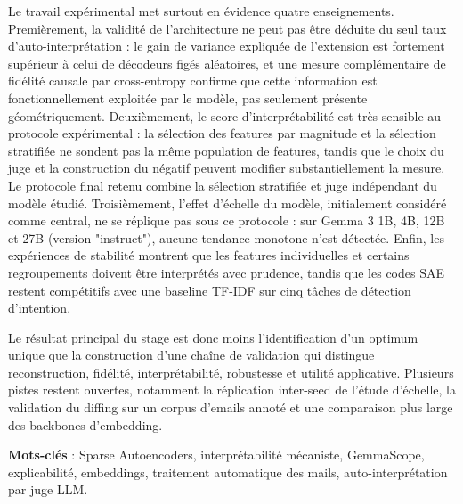 \documentclass[11pt]{article}
\begin{document}
Le travail expérimental met surtout en évidence quatre enseignements. Premièrement,
la validité de l'architecture ne peut pas être déduite du seul taux d'auto-interprétation :
le gain de variance expliquée de l'extension est fortement supérieur à celui de
décodeurs figés aléatoires, et une mesure complémentaire de fidélité causale par
cross-entropy confirme que cette information est fonctionnellement exploitée par le
modèle, pas seulement présente géométriquement. Deuxièmement, le score d'interprétabilité est
très sensible au protocole expérimental : la sélection des features par magnitude et
la sélection stratifiée ne sondent pas la même population de features, tandis que le
choix du juge et la construction du négatif peuvent modifier substantiellement la
mesure. Le protocole final retenu combine la sélection stratifiée et juge indépendant du modèle étudié. Troisièmement, l'effet d'échelle du modèle, initialement considéré
comme central, ne se réplique pas sous ce protocole : sur Gemma 3 1B, 4B, 12B et 27B (version "instruct"), aucune
tendance monotone n'est détectée. Enfin, les expériences de stabilité montrent que les
features individuelles et certains regroupements doivent être interprétés avec
prudence, tandis que les codes SAE restent compétitifs avec une baseline TF-IDF sur
cinq tâches de détection d'intention.

Le résultat principal du stage est donc moins l'identification d'un optimum unique que
la construction d'une chaîne de validation qui distingue reconstruction, fidélité,
interprétabilité, robustesse et utilité applicative. Plusieurs pistes restent ouvertes,
notamment la réplication inter-seed de l'étude d'échelle, la validation du diffing sur
un corpus d'emails annoté et une comparaison plus large des backbones d'embedding.

\textbf{Mots-clés} : Sparse Autoencoders, interprétabilité mécaniste, GemmaScope,
explicabilité, embeddings, traitement automatique des mails, auto-interprétation par
juge LLM.

\newpage
\tableofcontents
\newpage
\listoffigures
\listoftables
\newpage
\end{document}
